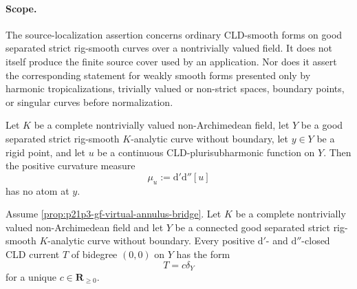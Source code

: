 \paragraph{Scope.}
The source-localization assertion concerns ordinary CLD-smooth forms on good
separated strict rig-smooth curves over a nontrivially valued field.  It does
not itself produce the finite source cover used by an application.  Nor does
it assert the corresponding statement for weakly smooth forms presented only
by harmonic tropicalizations, trivially valued or non-strict spaces, boundary
points, or singular curves before normalization.


\begin{lemma}
\label{lem:p21p3-gfc-rigid-zero-atom}
Let $K$ be a complete nontrivially valued non-Archimedean field, let
$Y$ be a good separated strict rig-smooth $K$-analytic curve without
boundary, let $y\in Y$ be a rigid point, and let $u$ be a continuous
CLD-plurisubharmonic function on $Y$.  Then the positive curvature
measure
\[
                         \mu_u:=\mathrm d'\mathrm d''[u]
\]
has no atom at $y$.
\end{lemma}

\begin{proposition}
\label{prop:p21p3-gfc-smooth-rigidity}
Assume \cref{prop:p21p3-gf-virtual-annulus-bridge}.  Let $K$ be a
complete nontrivially valued non-Archimedean field and let $Y$ be a
connected good separated strict rig-smooth $K$-analytic curve without
boundary.  Every positive $\mathrm d'$- and $\mathrm d''$-closed CLD
current $T$ of bidegree $(0,0)$ on $Y$ has the form
\begin{equation}
\label{eq:p21p3-gfc-smooth-rigidity}
                              T=c\delta_Y
\end{equation}
for a unique $c\in\mathbf R_{\geq0}$.
\end{proposition}

